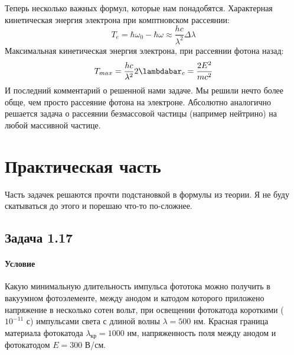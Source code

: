 \documentclass[12pt]{article}
\begin{document}
Теперь несколько важных формул, которые нам понадобятся. Характерная кинетическая энергия электрона при комптновском рассеянии:
\begin{equation*}
    T_e = \hbar\omega_0 - \hbar\omega \approx \dfrac{hc}{\lambda^2}\Delta\lambda
\end{equation*}
Максимальная кинетическая энергия электрона, при рассеянии фотона назад:
\begin{equation*}
    T_{max} =  \dfrac{hc}{\lambda^2}2\lambdabar_c = \dfrac{2E^2}{mc^2}
\end{equation*}
И последний комментарий о решенной нами задаче. Мы решили нечто более обще, чем просто рассеяние фотона на электроне. Абсолютно аналогично решается задача о рассеянии безмассовой частицы (например нейтрино) на любой массивной частице.
\section{Практическая часть}
Часть задачек решаются прочти подстановкой в формулы из теории. Я не буду скатываться до этого и порешаю что-то по-сложнее. 
\subsection{Задача 1.17}
\label{task_117}
\paragraph{Условие} Какую минимальную длительность импульса фототока можно получить в вакуумном фотоэлементе, между анодом и катодом которого приложено напряжение в несколько сотен вольт, при освещении фотокатода короткими ($10^{-11}$ с) импульсами света с длиной волны $\lambda = 500$ нм. Красная граница материала фотокатода $\lambda_{\text{кр}} = 1000$ нм, напряженность поля между анодом и фотокатодом $E= 300$ В/см.
\end{document}
